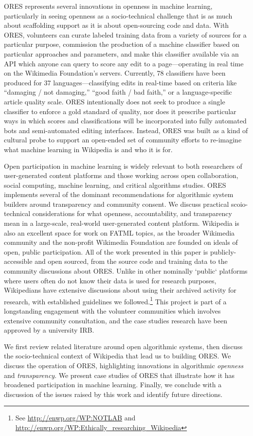 ORES represents several innovations in openness in machine learning, particularly in seeing openness as a socio-technical challenge that is as much about scaffolding support as it is about open-sourcing code and data. With ORES, volunteers can curate labeled training data from a variety of sources for a particular purpose, commission the production of a machine classifier based on particular approaches and parameters, and make this classifier available via an API which anyone can query to score any edit to a page---operating in real time on the Wikimedia Foundation's servers. Currently, 78 classifiers have been produced for 37 languages---classifying edits in real-time based on criteria like ``damaging / not damaging,'' ``good faith / bad faith,'' or a language-specific article quality scale. ORES intentionally does not seek to produce a single classifier to enforce a gold standard of quality, nor does it prescribe particular ways in which scores and classifications will be incorporated into fully automated bots and semi-automated editing interfaces. Instead, ORES was built as a kind of cultural probe \cite{hutchinson2003technology} to support an open-ended set of community efforts to re-imagine what machine learning in Wikipedia is and who it is for.

Open participation in machine learning is widely relevant to both researchers of user-generated content platforms and those working across open collaboration, social computing, machine learning, and critical algorithms studies. ORES implements several of the dominant recommendations for algorithmic system builders around transparency and community consent\cite{crawford2016algorithm,diakopoulos2015algorithmic,sandvig2014auditing}. We discuss practical scoio-technical considerations for what openness, accountability, and transparency mean in a large-scale, real-world user-generated content platform. Wikipedia is also an excellent space for work on FATML topics, as the broader Wikimedia community and the non-profit Wikimedia Foundation are founded on ideals of open, public participation. All of the work presented in this paper is publicly-accessible and open sourced, from the source code and training data to the community discussions about ORES. Unlike in other nominally `public` platforms where users often do not know their data is used for research purposes, Wikipedians have extensive discussions about using their archived activity for research, with established guidelines we followed.\footnote{See \url{http://enwp.org/WP:NOTLAB} and \url{http://enwp.org/WP:Ethically_researching_Wikipedia}} This project is part of a longstanding engagement with the volunteer communities which involves extensive community consultation, and the case studies research have been approved by a university IRB.

We first review related literature around open algorithmic systems, then discuss the socio-technical context of Wikipedia that lead us to building ORES. We discuss the operation of ORES, highlighting innovations in algorithmic \emph{openness} and \emph{transparency}. We present case studies of ORES that illustrate how it has broadened participation in machine learning.  Finally, we conclude with a discussion of the issues raised by this work and identify future directions.
